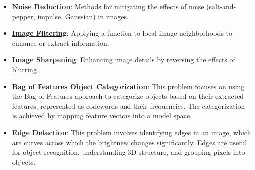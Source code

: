 \documentclass{article}%
\begin{document}
\begin{itemize}[leftmargin=*]
\item \href{https://purdue.brightspace.com/d2l/common/assets/pdfjs-d2l-dist/1.0.14-legacy/web/viewer.html?file=\%2Fcontent\%2Fenforced\%2F1095467-wl.202510.CS.24300.001\%2F07L2-Vision.pdf\%3Fou\%3D1095467\&lang=en-us\&container=d2l-fileviewer-rendered-pdf\&fullscreen=d2l-fileviewer-rendered-pdf-dialog\&height=667#page=35}{\textbf{Noise Reduction}}: Methods for mitigating the effects of noise (salt-and-pepper, impulse, Gaussian) in images.%
\item \href{https://purdue.brightspace.com/d2l/common/assets/pdfjs-d2l-dist/1.0.14-legacy/web/viewer.html?file=\%2Fcontent\%2Fenforced\%2F1095467-wl.202510.CS.24300.001\%2F07L2-Vision.pdf\%3Fou\%3D1095467\&lang=en-us\&container=d2l-fileviewer-rendered-pdf\&fullscreen=d2l-fileviewer-rendered-pdf-dialog\&height=667#page=49}{\textbf{Image Filtering}}: Applying a function to local image neighborhoods to enhance or extract information.%
\item \href{https://purdue.brightspace.com/d2l/common/assets/pdfjs-d2l-dist/1.0.14-legacy/web/viewer.html?file=\%2Fcontent\%2Fenforced\%2F1095467-wl.202510.CS.24300.001\%2F07L2-Vision.pdf\%3Fou\%3D1095467\&lang=en-us\&container=d2l-fileviewer-rendered-pdf\&fullscreen=d2l-fileviewer-rendered-pdf-dialog\&height=667#page=52}{\textbf{Image Sharpening}}: Enhancing image details by reversing the effects of blurring.%
\item \href{https://purdue.brightspace.com/d2l/common/assets/pdfjs-d2l-dist/1.0.14-legacy/web/viewer.html?file=\%2Fcontent\%2Fenforced\%2F1095467-wl.202510.CS.24300.001\%2F08L2-Feature Extraction.pdf\%3Fou\%3D1095467\&lang=en-us\&container=d2l-fileviewer-rendered-pdf\&fullscreen=d2l-fileviewer-rendered-pdf-dialog\&height=667#page=3}{\textbf{Bag of Features Object Categorization}}: This problem focuses on using the Bag of Features approach to categorize objects based on their extracted features, represented as codewords and their frequencies. The categorization is achieved by mapping feature vectors into a model space.%
\item \href{https://purdue.brightspace.com/d2l/common/assets/pdfjs-d2l-dist/1.0.14-legacy/web/viewer.html?file=\%2Fcontent\%2Fenforced\%2F1095467-wl.202510.CS.24300.001\%2F08L2-Feature Extraction.pdf\%3Fou\%3D1095467\&lang=en-us\&container=d2l-fileviewer-rendered-pdf\&fullscreen=d2l-fileviewer-rendered-pdf-dialog\&height=667#page=4}{\textbf{Edge Detection}}: This problem involves identifying edges in an image, which are curves across which the brightness changes significantly. Edges are useful for object recognition, understanding 3D structure, and grouping pixels into objects.%

\end{itemize}
\end{document}
